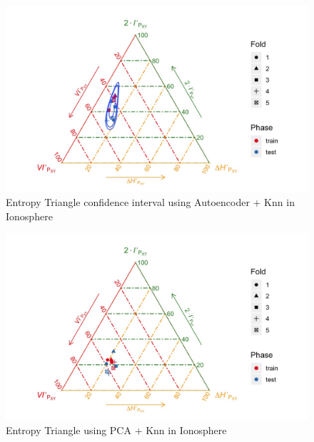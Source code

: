 \begin{figure}[H]
	\centering
	\includegraphics[width=\linewidth]{Figuras_tfg/ET_Iono_Auto_Knn_Confidence}
	\caption{Entropy Triangle confidence interval using Autoencoder + Knn in Ionosphere}
	\label{fig:figure_Knn_Iono_ET_Auto_Confidence}
\end{figure}

\begin{figure}[H]
	\centering
	\includegraphics[width=\linewidth]{Figuras_tfg/ET_Iono_PCA_Knn}
	\caption{Entropy Triangle using PCA + Knn in Ionosphere}
	\label{fig:figure_Knn_Iono_ET_PCA}
\end{figure}

